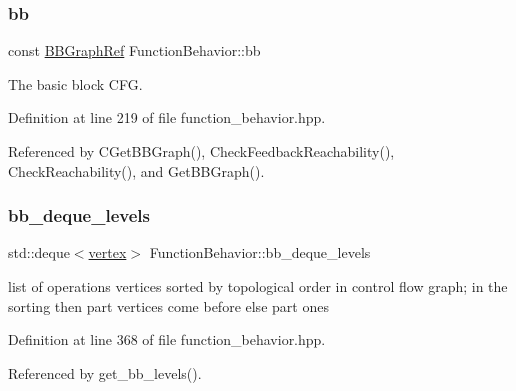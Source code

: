 \mbox{\label{classFunctionBehavior_abeeb56077e46d00dd8275a49a97bf0b4}} 
\subsubsection{\texorpdfstring{bb}{bb}}
{\footnotesize\ttfamily const \hyperlink{basic__block_8hpp_a0e7f233d1b83cad0bfd5aa865f0d3532}{B\+B\+Graph\+Ref} Function\+Behavior\+::bb\hspace{0.3cm}{\ttfamily [private]}}



The basic block C\+FG. 



Definition at line 219 of file function\+\_\+behavior.\+hpp.



Referenced by C\+Get\+B\+B\+Graph(), Check\+Feedback\+Reachability(), Check\+Reachability(), and Get\+B\+B\+Graph().

\mbox{\label{classFunctionBehavior_af80e314f0a6f6f154315eb233ce983cb}} 
\subsubsection{\texorpdfstring{bb\+\_\+deque\+\_\+levels}{bb\_deque\_levels}}
{\footnotesize\ttfamily std\+::deque$<$\hyperlink{graph_8hpp_abefdcf0544e601805af44eca032cca14}{vertex}$>$ Function\+Behavior\+::bb\+\_\+deque\+\_\+levels\hspace{0.3cm}{\ttfamily [private]}}



list of operations vertices sorted by topological order in control flow graph; in the sorting then part vertices come before else part ones 



Definition at line 368 of file function\+\_\+behavior.\+hpp.



Referenced by get\+\_\+bb\+\_\+levels().

\mbox{\label{classFunctionBehavior_a10ddb15800e947c1da7edc2cbe19ad50}} 
